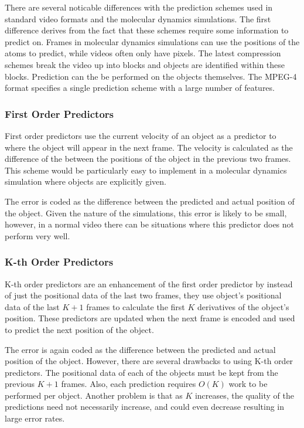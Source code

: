 \documentclass[twocolumn, a4paper,10pt]{article}
\begin{document}
There are several noticable differences with the prediction schemes used in standard video formats and the molecular dynamics simulations. The first difference derives from the fact that these schemes require some information to predict on. Frames in molecular dynamics simulations can use the positions of the atoms to predict, while videos often only have pixels. The latest compression schemes break the video up into blocks and objects are identified within these blocks. Prediction can the be performed on the objects themselves. The MPEG-4 format specifies a single prediction scheme with a large number of features\cite{wiegand2003oha}. 

\subsubsection*{First Order Predictors}

First order predictors use the current velocity of an object as a predictor to where the object will appear in the next frame. The velocity is calculated as the difference of the between the positions of the object in the previous two frames. This scheme would be particularly easy to implement in a molecular dynamics simulation where objects are explicitly given.

The error is coded as the difference between the predicted and actual position of the object. Given the nature of the simulations, this error is likely to be small, however, in a normal video there can be situations where this predictor does not perform very well.

\subsubsection*{K-th Order Predictors}

K-th order predictors are an enhancement of the first order predictor by instead of just the positional data of the last two frames, they use object's positional data of the last $K+1$ frames to calculate the first $K$ derivatives of the object's position. These predictors are updated when the next frame is encoded and used to predict the next position of the object.

The error is again coded as the difference between the predicted and actual position of the object. However, there are several drawbacks to using K-th order predictors. The positional data of each of the objects must be kept from the previous $K+1$ frames. Also, each prediction requires $O(K)$ work to be performed per object. Another problem is that as $K$ increases, the quality of the predictions need not necessarily increase, and could even decrease resulting in large error rates.
\end{document}
